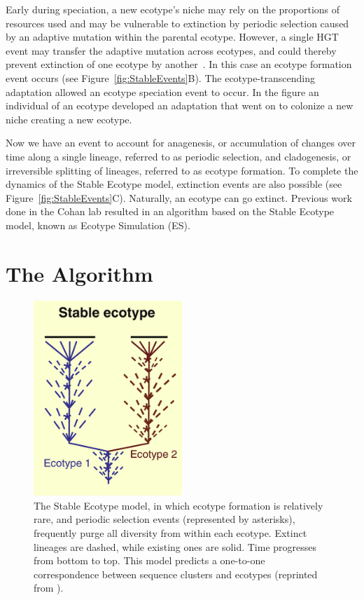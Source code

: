 Early during speciation, a new ecotype's niche may rely on the proportions of resources used and may be vulnerable to extinction by periodic selection caused by an adaptive mutation within the parental ecotype.
However, a single HGT event may transfer the adaptive mutation across ecotypes, and could thereby prevent extinction of one ecotype by another~\cite{cohan2008origins}.
In this case an ecotype formation event occurs (see Figure~\ref{fig:StableEvents}B).
The ecotype-transcending adaptation allowed an ecotype speciation event to occur. In the figure an individual of an ecotype developed an adaptation that went on to colonize a new niche creating a new ecotype.

Now we have an event to account for anagenesis, or accumulation of changes over time along a single lineage, referred to as periodic selection, and cladogenesis, or irreversible splitting of lineages, referred to as ecotype formation.
To complete the dynamics of the Stable Ecotype model, extinction events are also possible (see Figure~\ref{fig:StableEvents}C).
Naturally, an ecotype can go extinct.
Previous work done in the Cohan lab resulted in an algorithm based on the Stable Ecotype model, known as Ecotype Simulation (ES).


\section{The Algorithm}

\begin{figure}
 \caption[Phylogenetic tree representation of typical Stable Ecotype model case.]{ The Stable Ecotype model, in which ecotype formation is relatively rare, and periodic selection events (represented by asterisks), frequently purge all diversity from within each ecotype. Extinct lineages are dashed, while existing ones are solid. Time progresses from bottom to top. This model predicts a one-to-one correspondence between sequence clusters and ecotypes (reprinted from \protect\cite{cohan2008origins}). }
 \centering
 \label{fig:StableTree}
 \includegraphics[width=0.5\textwidth]{images/StableTree-CH2}
\end{figure}

